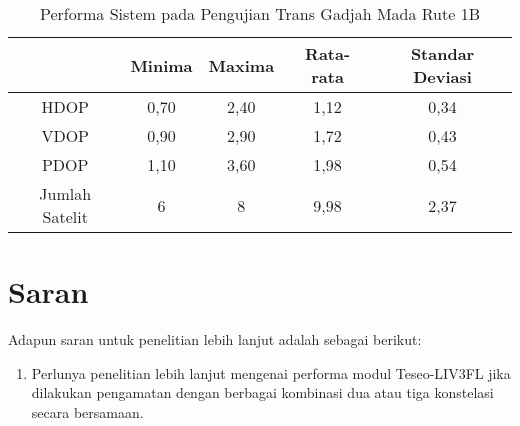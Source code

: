 \begin{enumerate}
	\begin{table}[H]
		\caption{Performa Sistem pada Pengujian Trans Gadjah Mada Rute 1B}
		\vspace{0.5em}
		\centering
		\begin{tabular}{ccccc}
			\hline
			& \textbf{Minima} & \textbf{Maxima} & \textbf{Rata-rata} & \textbf{Standar Deviasi}\\
			\hline 
			HDOP & 0,70 & 2,40 & 1,12 & 0,34\\
			VDOP & 0,90	& 2,90 & 1,72 & 0,43\\
			PDOP & 1,10	& 3,60 & 1,98 & 0,54\\
			Jumlah Satelit & 6 & 8 & 9,98 & 2,37\\
			\hline
		\end{tabular}
		\label{Tab: performa-tgm-1b}
	\end{table}
\end{enumerate}

\section{Saran}
Adapun saran untuk penelitian lebih lanjut adalah sebagai berikut:
\begin{enumerate}
	\item Perlunya penelitian lebih lanjut mengenai performa modul Teseo-LIV3FL jika dilakukan pengamatan dengan berbagai kombinasi dua atau tiga konstelasi secara bersamaan.
\end{enumerate}

